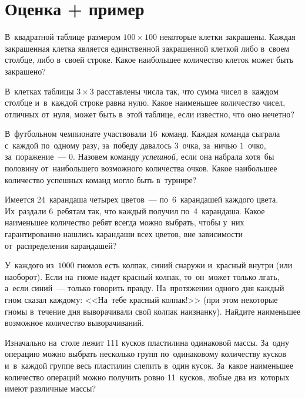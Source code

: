 
\section*{Оценка + пример}


\begin{problems}

\item
В~квадратной таблице размером $100 \times 100$ некоторые клетки закрашены.
Каждая закрашенная клетка является единственной закрашенной клеткой либо
в~своем столбце, либо в~своей строке.
Какое наибольшее количество клеток может быть закрашено?

\item
В~клетках таблицы $3 \times 3$ расставлены числа так, что сумма чисел в~каждом
столбце и~в~каждой строке равна нулю.
Какое наименьшее количество чисел, отличных от~нуля, может быть в~этой таблице,
если известно, что оно нечетно?

\item
В~футбольном чемпионате участвовали $16$~команд.
Каждая команда сыграла с~каждой по~одному разу, за~победу давалось $3$~очка,
за~ничью $1$~очко, за~поражение~--- $0$.
Назовем команду \emph{успешной,} если она набрала хотя~бы половину
от~наибольшего возможного количества очков.
Какое наибольшее количество успешных команд могло быть в~турнире?

\item
Имеется 24~карандаша четырех цветов~--- по~6~карандашей каждого цвета.
Их~раздали 6~ребятам так, что каждый получил по~4~карандаша.
Какое наименьшее количество ребят всегда можно выбрать, чтобы у~них
гарантированно нашлись карандаши всех цветов, вне зависимости от~распределения
карандашей?

\item
У~каждого из~$1000$ гномов есть колпак, синий снаружи и~красный внутри
(или наоборот).
Если на~гноме надет красный колпак, то~он~может только лгать, а~если синий~---
только говорить правду.
На~протяжении одного дня каждый гном сказал каждому:
<<На~тебе красный колпак!>>
(при этом некоторые гномы в~течение дня выворачивали свой колпак наизнанку).
Найдите наименьшее возможное количество выворачиваний.

\item
Изначально на~столе лежит 111 кусков пластилина одинаковой массы.
За~одну операцию можно выбрать несколько групп по~одинаковому количеству кусков
и~в~каждой группе весь пластилин слепить в~один кусок.
За~какое наименьшее количество операций можно получить ровно 11~кусков, любые
два из~которых имеют различные массы?


\end{problems}
